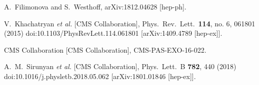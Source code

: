 \documentclass[12pt,letterpaper,notitlepage]{article}
\begin{document}
\begin{thebibliography}{6}

  A.~Filimonova and S.~Westhoff,
  arXiv:1812.04628 [hep-ph].

    V.~Khachatryan {\it et al.} [CMS Collaboration],
    Phys.\ Rev.\ Lett.\  {\bf 114}, no. 6, 061801 (2015)
    doi:10.1103/PhysRevLett.114.061801
    [arXiv:1409.4789 [hep-ex]].


    CMS Collaboration [CMS Collaboration],
    CMS-PAS-EXO-16-022.

  A.~M.~Sirunyan {\it et al.} [CMS Collaboration],
  Phys.\ Lett.\ B {\bf 782}, 440 (2018)
  doi:10.1016/j.physletb.2018.05.062
  [arXiv:1801.01846 [hep-ex]].

\end{thebibliography}
\end{document}
